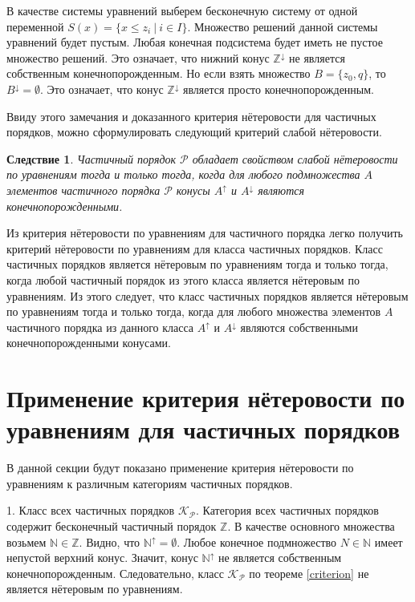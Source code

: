 \documentclass[12pt]{article}
\theoremstyle{break}
\newtheorem{Con}{Следствие}
\def\P{\mathcal{P}}
\begin{document}
		В качестве системы уравнений выберем бесконечную систему от одной переменной $S(x) = \{x\leqslant z_i\ |\ i\in I\}.$ Множество решений данной системы уравнений будет пустым. Любая конечная подсистема будет иметь не пустое множество решений. Это означает, что нижний конус $\mathbb{Z}^{\downarrow}$ не является собственным конечнопорожденным. Но если взять множество $B = \{z_0, q\}$, то $B^{\downarrow} = \emptyset$. Это означает, что конус $\mathbb{Z}^{\downarrow}$ является просто конечнопорожденным.

		Ввиду этого замечания и доказанного критерия нётеровости для частичных порядков, можно сформулировать следующий критерий слабой нётеровости.

		\begin{Con}
			Частичный порядок $\P$ обладает свойством слабой нётеровости по уравнениям тогда и только тогда, когда для любого подмножества $A$ элементов частичного порядка $\P$ конусы $A^{\uparrow}$ и $A^{\downarrow}$ являются конечнопорожденными.
		\end{Con}

		Из критерия нётеровости по уравнениям для частичного порядка легко получить критерий нётеровости по уравнениям для класса частичных порядков. Класс частичных порядков является нётеровым по уравнениям тогда и только тогда, когда любой частичный порядок из этого класса является нётеровым по уравнениям. Из этого следует, что класс частичных порядков является нётеровым по уравнениям тогда и только тогда, когда для любого множества элементов $A$ частичного порядка из данного класса $A^{\uparrow}$ и $A^{\downarrow}$ являются собственными конечнопорожденными конусами.


	\section{Применение критерия нётеровости по уравнениям для частичных порядков}
		В данной секции будут показано применение критерия нётеровости по уравнениям к различным категориям частичных порядков.

		1. Класс всех частичных порядков $\mathcal{K}_{\P}.$ Категория всех частичных порядков содержит бесконечный частичный порядок $\mathbb{Z}$. В качестве основного множества возьмем $\mathbb{N}\in\mathbb{Z}$. Видно, что $\mathbb{N}^{\uparrow} = \emptyset$. Любое конечное подмножество $N\in\mathbb{N}$ имеет непустой верхний конус. Значит, конус $\mathbb{N}^{\uparrow}$ не является собственным конечнопорожденным. Следовательно, класс $\mathcal{K}_{\P}$ по теореме \ref{criterion} не является нётеровым по уравнениям.
\end{document}
